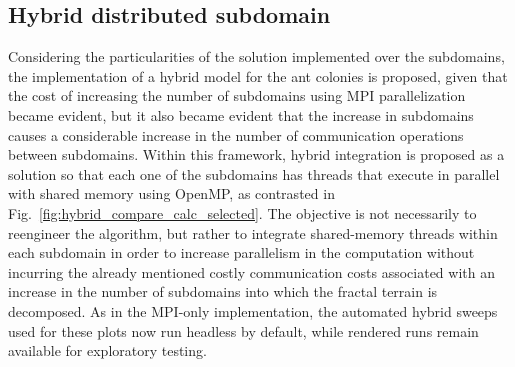 \subsection{Hybrid distributed subdomain}
Considering the particularities of the solution implemented over the subdomains, the implementation of a hybrid model for the ant colonies is proposed, given that the cost of increasing the number of subdomains using MPI parallelization became evident, but it also became evident that the increase in subdomains causes a considerable increase in the number of communication operations between subdomains. Within this framework, hybrid integration is proposed as a solution so that each one of the subdomains has threads that execute in parallel with shared memory using OpenMP, as contrasted in Fig.~\ref{fig:hybrid_compare_calc_selected}. The objective is not necessarily to reengineer the algorithm, but rather to integrate shared-memory threads within each subdomain in order to increase parallelism in the computation without incurring the already mentioned costly communication costs associated with an increase in the number of subdomains into which the fractal terrain is decomposed. As in the MPI-only implementation, the automated hybrid sweeps used for these plots now run headless by default, while rendered runs remain available for exploratory testing.

